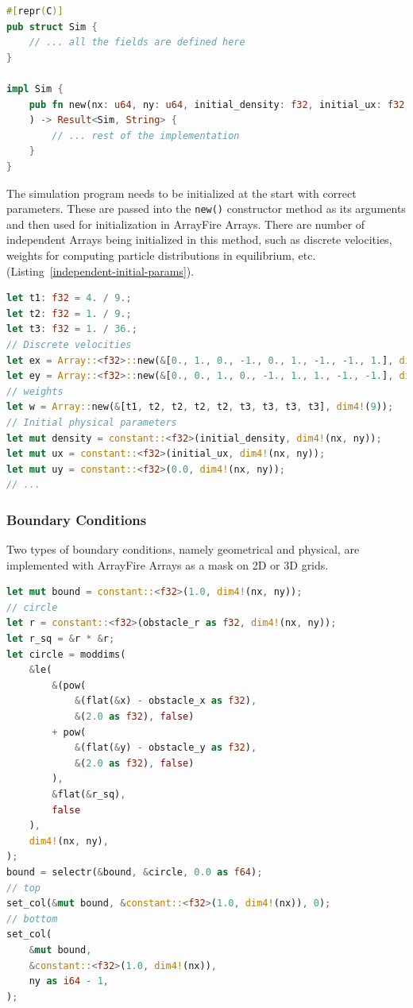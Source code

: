 \begin{lstlisting}[language=Rust, caption=Implementation of Sim struct with constructor method., label=sim-struct]
#[repr(C)]
pub struct Sim {
	// ... all the fields are defined here
}

impl Sim {
	pub fn new(nx: u64, ny: u64, initial_density: f32, initial_ux: f32, omega: f32, obstacle_x: u64, obstacle_y: u64, obstacle_r: u64
	) -> Result<Sim, String> {
		// ... rest of the implementation
	}
}
\end{lstlisting}

The simulation program needs to be initialized at the start with correct parameters. These are passed into the \texttt{new()} constructor method as its arguments and then used for initialization in ArrayFire Arrays. There are number of independent Arrays being initialized in this method, such as discrete velocities, weights for computing particle distributions in equilibrium, etc. (Listing~\ref{independent-initial-params}).

\begin{lstlisting}[language=Rust, caption=Setting initial parameters that are independent from constructor method's input arguments., label=independent-initial-params]
let t1: f32 = 4. / 9.;
let t2: f32 = 1. / 9.;
let t3: f32 = 1. / 36.;
// Discrete velocities
let ex = Array::<f32>::new(&[0., 1., 0., -1., 0., 1., -1., -1., 1.], dim4!(9));
let ey = Array::<f32>::new(&[0., 0., 1., 0., -1., 1., 1., -1., -1.], dim4!(9));
// weights
let w = Array::new(&[t1, t2, t2, t2, t2, t3, t3, t3, t3], dim4!(9));
// Initial physical parameters
let mut density = constant::<f32>(initial_density, dim4!(nx, ny));
let mut ux = constant::<f32>(initial_ux, dim4!(nx, ny));
let mut uy = constant::<f32>(0.0, dim4!(nx, ny));
// ...
\end{lstlisting}


\subsubsection{Boundary Conditions}

Two types of boundary conditions, namely geometrical and physical, are implemented with ArrayFire Arrays as a mask on 2D or 3D grids. 

\begin{lstlisting}[language=Rust, caption=Setting the geometrical boundary conditions of circle in a pipe flow (2D Karmán vortex)., label=init-circle]
let mut bound = constant::<f32>(1.0, dim4!(nx, ny));
// circle
let r = constant::<f32>(obstacle_r as f32, dim4!(nx, ny));
let r_sq = &r * &r;
let circle = moddims(
	&le(
		&(pow(
			&(flat(&x) - obstacle_x as f32),
			&(2.0 as f32), false)
		+ pow(
			&(flat(&y) - obstacle_y as f32),
			&(2.0 as f32), false)
		),
		&flat(&r_sq),
		false
	),
	dim4!(nx, ny),
);
bound = selectr(&bound, &circle, 0.0 as f64);
// top
set_col(&mut bound, &constant::<f32>(1.0, dim4!(nx)), 0);
// bottom
set_col(
	&mut bound,
	&constant::<f32>(1.0, dim4!(nx)),
	ny as i64 - 1,
);
\end{lstlisting}


